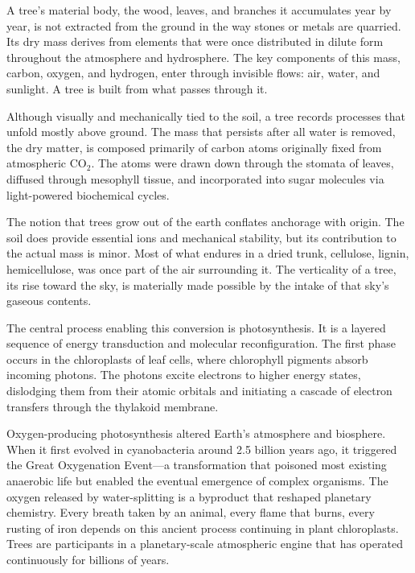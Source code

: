 A tree's material body, the wood, leaves, and branches it accumulates year by year, is not extracted from the ground in the way stones or metals are quarried. Its dry mass derives from elements that were once distributed in dilute form throughout the atmosphere and hydrosphere. The key components of this mass, carbon, oxygen, and hydrogen, enter through invisible flows: air, water, and sunlight. A tree is built from what passes through it.

Although visually and mechanically tied to the soil, a tree records processes that unfold mostly above ground. The mass that persists after all water is removed, the dry matter, is composed primarily of carbon atoms originally fixed from atmospheric \(\mathrm{CO}_2\). The atoms were drawn down through the stomata of leaves, diffused through mesophyll tissue, and incorporated into sugar molecules via light-powered biochemical cycles. 

The notion that trees \QSOpen{}grow out of the earth\QSClose{} conflates anchorage with origin. The soil does provide essential ions and mechanical stability, but its contribution to the actual mass is minor. Most of what endures in a dried trunk, cellulose, lignin, hemicellulose, was once part of the air surrounding it. The verticality of a tree, its rise toward the sky, is materially made possible by the intake of that sky's gaseous contents.

The central process enabling this conversion is photosynthesis. It is a layered sequence of energy transduction and molecular reconfiguration. The first phase occurs in the chloroplasts of leaf cells, where chlorophyll pigments absorb incoming photons. The photons excite electrons to higher energy states, dislodging them from their atomic orbitals and initiating a cascade of electron transfers through the thylakoid membrane.

Oxygen-producing photosynthesis altered Earth's atmosphere and biosphere. When it first evolved in cyanobacteria around 2.5 billion years ago, it triggered the Great Oxygenation Event—a transformation that poisoned most existing anaerobic life but enabled the eventual emergence of complex organisms. The oxygen released by water-splitting is a byproduct that reshaped planetary chemistry. Every breath taken by an animal, every flame that burns, every rusting of iron depends on this ancient process continuing in plant chloroplasts. Trees are participants in a planetary-scale atmospheric engine that has operated continuously for billions of years.

